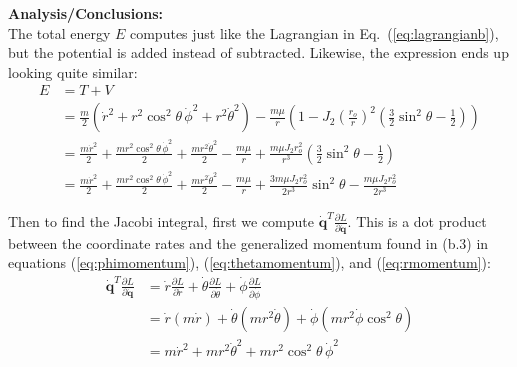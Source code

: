 \documentclass[titlepage]{article}
\begin{document}
\textbf{Analysis/Conclusions:}\\

The total energy $E$ computes just like the Lagrangian in Eq.~(\ref{eq:lagrangianb}), but the potential is added instead of subtracted. Likewise, the expression ends up looking quite similar:
\begin{equation}
	\begin{split}
		E&=T+V \\
		&=\frac{m}{2}\left(\dot{r}^2+r^2\cos^2\theta\,\dot{\phi}^2+r^2\dot{\theta}^2\right)-\frac{m\mu}{r}\left(1-J_2\left(\frac{r_o}{r}\right)^2\left(\frac{3}{2}\sin^2\theta-\frac{1}{2}\right)\right) \\
		&=\frac{m\dot{r}^2}{2}+\frac{mr^2\cos^2\theta\,\dot{\phi}^2}{2}+\frac{mr^2\dot{\theta}^2}{2}-\frac{m\mu}{r}+\frac{m\mu J_2r_o^2}{r^3}\left(\frac{3}{2}\sin^2\theta-\frac{1}{2}\right) \\
		&=\frac{m\dot{r}^2}{2}+\frac{mr^2\cos^2\theta\,\dot{\phi}^2}{2}+\frac{mr^2\dot{\theta}^2}{2}-\frac{m\mu}{r}+\frac{3m\mu J_2r_o^2}{2r^3}\sin^2\theta-\frac{m\mu J_2r_o^2}{2r^3}
	\end{split}
\end{equation}

Then to find the Jacobi integral, first we compute $\dot{\boldsymbol{q}}^T\frac{\partial L}{\partial\dot{\boldsymbol{q}}}$. This is a dot product between the coordinate rates and the generalized momentum found in (b.3) in equations (\ref{eq:phimomentum}), (\ref{eq:thetamomentum}), and (\ref{eq:rmomentum}):
\begin{equation}
	\begin{split}
		\dot{\boldsymbol{q}}^T\frac{\partial L}{\partial\dot{\boldsymbol{q}}}&=\dot{r}\frac{\partial L}{\partial\dot{r}}+\dot{\theta}\frac{\partial L}{\partial\dot{\theta}}+\dot{\phi}\frac{\partial L}{\partial\dot{\phi}} \\
		&=\dot{r}\left(m\dot{r}\right)+\dot{\theta}\left(mr^2\dot{\theta}\right)+\dot{\phi}\left(mr^2\dot{\phi}\cos^2\theta\right) \\
		&=m\dot{r}^2+mr^2\dot{\theta}^2+mr^2\cos^2\theta\,\dot{\phi}^2
	\end{split}
\end{equation}

\newpage
\end{document}
